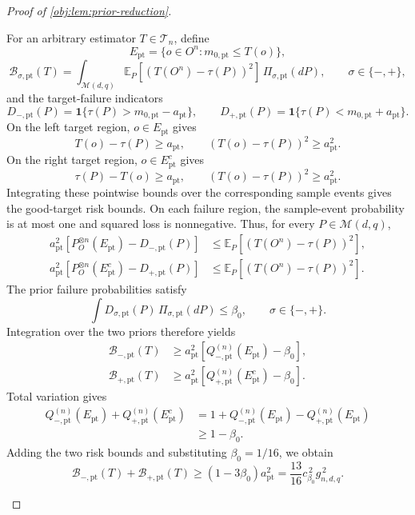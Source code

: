 \begin{proof}[Proof of \cref{obj:lem:prior-reduction}]
\begin{enumerate}
For an arbitrary estimator \(T\in\mathcal T_n\), define
\[
E_{\mathrm{pt}}
=\{o\in O^n:m_{0,\mathrm{pt}}\le T(o)\},
\]
\[
\mathcal B_{\sigma,\mathrm{pt}}(T)
=\int_{\mathcal M(d,q)}
  \mathbb E_P\!\left[(T(O^n)-\tau(P))^2\right]\,
  \Pi_{\sigma,\mathrm{pt}}(dP),
\qquad \sigma\in\{-,+\},
\]
and the target-failure indicators
\[
D_{-,\mathrm{pt}}(P)
=\mathbf1\{\tau(P)>m_{0,\mathrm{pt}}-a_{\mathrm{pt}}\},
\qquad
D_{+,\mathrm{pt}}(P)
=\mathbf1\{\tau(P)<m_{0,\mathrm{pt}}+a_{\mathrm{pt}}\}.
\]
On the left target region, \(o\in E_{\mathrm{pt}}\) gives
\[
T(o)-\tau(P)\ge a_{\mathrm{pt}},
\qquad
(T(o)-\tau(P))^2\ge a_{\mathrm{pt}}^2.
\]
On the right target region, \(o\in E_{\mathrm{pt}}^c\) gives
\[
\tau(P)-T(o)\ge a_{\mathrm{pt}},
\qquad
(T(o)-\tau(P))^2\ge a_{\mathrm{pt}}^2.
\]
Integrating these pointwise bounds over the corresponding sample events
gives the good-target risk bounds. On each failure region, the sample-event
probability is at most one and squared loss is nonnegative. Thus, for every
\(P\in\mathcal M(d,q)\),
\[
\begin{aligned}
a_{\mathrm{pt}}^2
\left[P_O^{\otimes n}(E_{\mathrm{pt}})-D_{-,\mathrm{pt}}(P)\right]
&\le \mathbb E_P[(T(O^n)-\tau(P))^2],\\
a_{\mathrm{pt}}^2
\left[P_O^{\otimes n}(E_{\mathrm{pt}}^c)-D_{+,\mathrm{pt}}(P)\right]
&\le \mathbb E_P[(T(O^n)-\tau(P))^2].
\end{aligned}
\]
The prior failure probabilities satisfy
\[
\int D_{\sigma,\mathrm{pt}}(P)\,
  \Pi_{\sigma,\mathrm{pt}}(dP)\le\beta_0,
\qquad \sigma\in\{-,+\}.
\]
Integration over the two priors therefore yields
\[
\begin{aligned}
\mathcal B_{-,\mathrm{pt}}(T)
&\ge a_{\mathrm{pt}}^2
 \left[Q_{-,\mathrm{pt}}^{(n)}(E_{\mathrm{pt}})-\beta_0\right],\\
\mathcal B_{+,\mathrm{pt}}(T)
&\ge a_{\mathrm{pt}}^2
 \left[Q_{+,\mathrm{pt}}^{(n)}(E_{\mathrm{pt}}^c)-\beta_0\right].
\end{aligned}
\]
Total variation gives
\[
\begin{aligned}
Q_{-,\mathrm{pt}}^{(n)}(E_{\mathrm{pt}})
+Q_{+,\mathrm{pt}}^{(n)}(E_{\mathrm{pt}}^c)
&=1+Q_{-,\mathrm{pt}}^{(n)}(E_{\mathrm{pt}})
     -Q_{+,\mathrm{pt}}^{(n)}(E_{\mathrm{pt}})\\
&\ge1-\beta_0.
\end{aligned}
\]
Adding the two risk bounds and substituting \(\beta_0=1/16\), we obtain
\[
\mathcal B_{-,\mathrm{pt}}(T)+\mathcal B_{+,\mathrm{pt}}(T)
\ge (1-3\beta_0)a_{\mathrm{pt}}^2
=\frac{13}{16}c_{\beta_0}^{\,2}g_{n,d,q}^{\,2}.
\]
\end{enumerate}
\end{proof}
